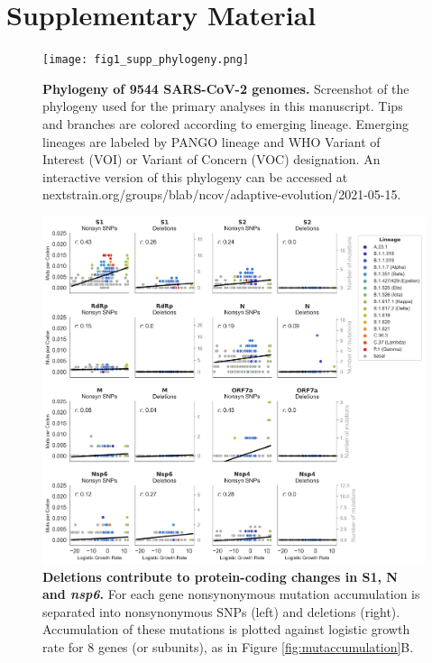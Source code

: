 \documentclass[11pt,oneside,letterpaper]{article}
\newcommand{\beginsupplement}{%
	\setcounter{figure}{0}
	\renewcommand{\thefigure}{S\arabic{figure}}%
}
\begin{document}
\section*{Supplementary Material}
\beginsupplement

\begin{figure}[h!]
	\centerline{\texttt{[image: fig1\_supp\_phylogeny.png]}}
	\caption{\textbf{Phylogeny of 9544 SARS-CoV-2 genomes.}
	Screenshot of the phylogeny used for the primary analyses in this manuscript. Tips and branches are colored according to emerging lineage. Emerging lineages are labeled by PANGO lineage and WHO Variant of Interest (VOI) or Variant of Concern (VOC) designation. An interactive version of this phylogeny can be accessed at nextstrain.org/groups/blab/ncov/adaptive-evolution/2021-05-15.
	}
	\label{fig:phylogeny}
\end{figure}

\begin{figure}[h!]
	\centerline{\includegraphics[scale=0.5]{fig1_supp_snpdel.png}}
	\caption{\textbf{Deletions contribute to protein-coding changes in S1, N and \emph{nsp6}.}
	For each gene nonsynonymous mutation accumulation is separated into nonsynonymous SNPs (left) and deletions (right). Accumulation of these mutations is plotted against logistic growth rate for 8 genes (or subunits), as in Figure \ref{fig:mutaccumulation}B.
	}
	\label{fig:snpdel}
\end{figure}
\end{document}
